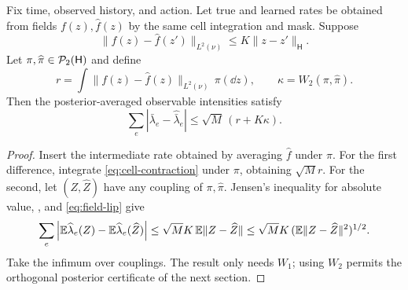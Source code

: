 \begin{lemma}\label{lem:posterior}
Fix time, observed history, and action. Let true and learned rates be obtained from fields $f(z),\widehat f(z)$ by the same cell integration and mask. Suppose
\begin{equation}\label{eq:field-lip}
 \|\widehat f(z)-\widehat f(z')\|_{L^2(\nu)}
 \le K\|z-z'\|_{\mathsf H}.
\end{equation}
Let $\pi,\widehat\pi\in\mathcal P_2(\mathsf H)$ and define
\[
 r=\int\|f(z)-\widehat f(z)\|_{L^2(\nu)}\,\pi(\dd z),
 \qquad \kappa=W_2(\pi,\widehat\pi).
\]
Then the posterior-averaged observable intensities satisfy
\begin{equation}\label{eq:rate-error}
 \sum_e|\bar\lambda_e-\widehat{\bar\lambda}_e|
 \le\sqrt M\,(r+K\kappa).
\end{equation}
\end{lemma}
\begin{proof}
Insert the intermediate rate obtained by averaging $\widehat f$ under $\pi$.
For the first difference, integrate \eqref{eq:cell-contraction} under $\pi$, obtaining $\sqrt M r$.
For the second, let $(Z,\widehat Z)$ have any coupling of $\pi,\widehat\pi$. Jensen's inequality for absolute value, , and \eqref{eq:field-lip} give
\[
 \sum_e\left|\mathbb E\widehat\lambda_e(Z)-\mathbb E\widehat\lambda_e(\widehat Z)\right|
 \le\sqrt M K\,\mathbb E\|Z-\widehat Z\|
 \le\sqrt M K\,(\mathbb E\|Z-\widehat Z\|^2)^{1/2}.
\]
Take the infimum over couplings. The result only needs $W_1$; using $W_2$ permits the orthogonal posterior certificate of the next section.
\end{proof}

